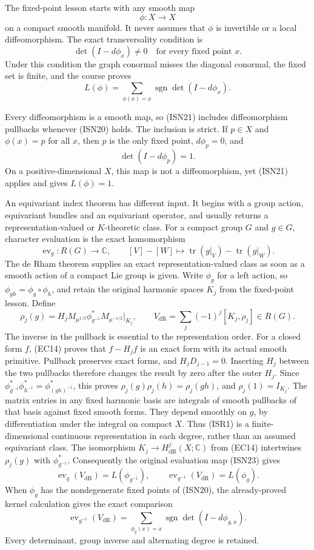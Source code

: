\documentclass[
  11pt,
]{article}
\begin{document}
The fixed-point lesson starts with any smooth map \[
 \phi:X\longrightarrow X
 \tag{ISN19}
\] on a compact smooth manifold. It never assumes that \(\phi\) is
invertible or a local diffeomorphism. The exact transversality condition
is \[
 \det(I-d\phi_x)\ne0
 \quad\text{for every fixed point }x.
 \tag{ISN20}
\] Under this condition the graph conormal misses the diagonal conormal,
the fixed set is finite, and the course proves \[
 L(\phi)
 =
 \sum_{\phi(x)=x}
 \operatorname{sgn}\det(I-d\phi_x).
 \tag{ISN21}
\]

Every diffeomorphism is a smooth map, so (ISN21) includes diffeomorphism
pullbacks whenever (ISN20) holds. The inclusion is strict. If \(p\in X\)
and \(\phi(x)=p\) for all \(x\), then \(p\) is the only fixed point,
\(d\phi_p=0\), and \[
 \det(I-d\phi_p)=1.
 \tag{ISN22}
\] On a positive-dimensional \(X\), this map is not a diffeomorphism,
yet (ISN21) applies and gives \(L(\phi)=1\).

An equivariant index theorem has different input. It begins with a group
action, equivariant bundles and an equivariant operator, and usually
returns a representation-valued or \(K\)-theoretic class. For a compact
group \(G\) and \(g\in G\), character evaluation is the exact
homomorphism \[
 \operatorname{ev}_g:R(G)\longrightarrow\mathbb C,
 \qquad
 [V]-[W]\longmapsto
 \operatorname{tr}(g|_V)-\operatorname{tr}(g|_W).
 \tag{ISN23}
\] The de Rham theorem supplies an exact representation-valued class as
soon as a smooth action of a compact Lie group is given. Write
\(\phi_g\) for a left action, so \(\phi_{gh}=\phi_g\circ\phi_h\), and
retain the original harmonic spaces \(K_j\) from the fixed-point lesson.
Define \[
 \rho_j(g)=H_jM_{\mu^{1/2}}\phi_{g^{-1}}^*
                        M_{\mu^{-1/2}}|_{K_j},\qquad
 V_{\mathrm{dR}}=\sum_j(-1)^j[K_j,\rho_j]\in R(G).
 \tag{ISR1}
\] The inverse in the pullback is essential to the representation order.
For a closed form \(f\), (EC14) proves that \(f-H_jf\) is an exact form
with its actual smooth primitive. Pullback preserves exact forms, and
\(H_jD_{j-1}=0\). Inserting \(H_j\) between the two pullbacks therefore
changes the result by zero after the outer \(H_j\). Since
\(\phi_{g^{-1}}^*\phi_{h^{-1}}^*=\phi_{(gh)^{-1}}^*\), this proves
\(\rho_j(g)\rho_j(h)=\rho_j(gh)\), and \(\rho_j(1)=I_{K_j}\). The matrix
entries in any fixed harmonic basis are integrals of smooth pullbacks of
that basis against fixed smooth forms. They depend smoothly on \(g\), by
differentiation under the integral on compact \(X\). Thus (ISR1) is a
finite-dimensional continuous representation in each degree, rather than
an assumed equivariant class. The isomorphism
\(K_j\to H^j_{\mathrm{dR}}(X;\mathbb C)\) from (EC14) intertwines
\(\rho_j(g)\) with \(\phi_{g^{-1}}^*\). Consequently the original
evaluation map (ISN23) gives \[
 \operatorname{ev}_g(V_{\mathrm{dR}})=L(\phi_{g^{-1}}),\qquad
 \operatorname{ev}_{g^{-1}}(V_{\mathrm{dR}})=L(\phi_g).
 \tag{ISR2}
\] When \(\phi_g\) has the nondegenerate fixed points of (ISN20), the
already-proved kernel calculation gives the exact comparison \[
 \operatorname{ev}_{g^{-1}}(V_{\mathrm{dR}})
   =\sum_{\phi_g(x)=x}\operatorname{sgn}\det(I-d\phi_{g,x}).
 \tag{ISR3}
\] Every determinant, group inverse and alternating degree is retained.
\end{document}
